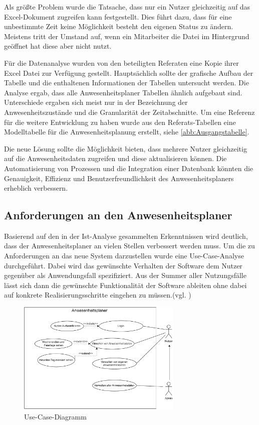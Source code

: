 Als größte Problem wurde die Tatsache, dass nur ein Nutzer gleichzeitig auf das Excel-Dokument zugreifen kann festgestellt. Dies führt dazu, dass für eine unbestimmte Zeit keine Möglichkeit besteht den eigenen Status zu ändern. Meistens tritt der Umstand auf, wenn ein Mitarbeiter die Datei im Hintergrund geöffnet hat diese aber nicht nutzt.

Für die Datenanalyse wurden von den beteiligten Referaten eine Kopie ihrer Excel Datei zur Verfügung gestellt. Hauptsächlich sollte der grafische Aufbau der Tabelle und die enthaltenen Informationen der Tabellen untersucht werden. Die Analyse ergab, dass alle Anwesenheitsplaner Tabellen ähnlich aufgebaut sind. Unterschiede ergaben sich meist nur in der Bezeichnung der Anwesenheitszustände und die Granularität der Zeitabschnitte. Um eine Referenz für die weitere Entwicklung zu haben wurde aus den Referats-Tabellen eine Modelltabelle für die Anwesenheitsplanung erstellt, siehe \ref{abb:Ausgangstabelle}.

Die neue Lösung sollte die Möglichkeit bieten, dass mehrere Nutzer gleichzeitig auf die Anwesenheitsdaten zugreifen und diese aktualisieren können. Die Automatisierung von Prozessen und die Integration einer Datenbank könnten die Genauigkeit, Effizienz und Benutzerfreundlichkeit des Anwesenheitsplaners erheblich verbessern.

\subsection{Anforderungen an den Anwesenheitsplaner}
\label{sec:Soll-Zustand}
Basierend auf den in der Ist-Analyse gesammelten Erkenntnissen wird deutlich, dass der Anwesenheitsplaner an vielen Stellen verbessert werden muss. Um die zu Anforderungen an das neue System darzustellen wurde eine Use-Case-Analyse durchgeführt. Dabei wird das gewünschte Verhalten der Software dem Nutzer gegenüber als Anwendungsfall spezifiziert. Aus der Summer aller Nutzungsfälle lässt sich dann die gewünschte Funktionalität der Software ableiten ohne dabei auf konkrete Realisierungsschritte eingehen zu müssen.(vgl. \cite[S. 164]{neumann-2002})

\begin{figure}[htb]
    \centering
    \includegraphics[width=0.7\textwidth,angle=0]{abb/use-case-diagramm.pdf}
    \caption[Beschreibung]{Use-Case-Diagramm}
    \label{fig:Use-Case-Diagramm}
\end{figure}

